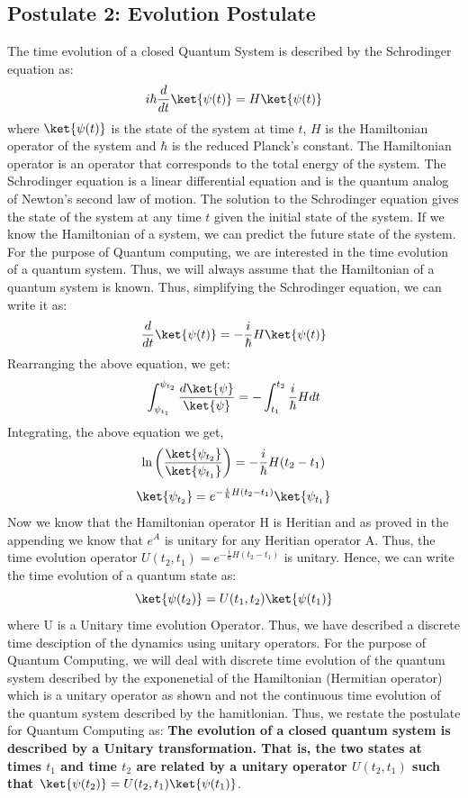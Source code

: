 \documentclass[12pt, oneside]{book}
\theoremstyle{definition}
\theoremstyle{definition}
\theoremstyle{remark}
\begin{document}
\subsection{Postulate 2: Evolution Postulate}\label{subsection:Postulate 2}
The time evolution of a closed Quantum System is described by the Schrodinger equation as:
\[
    i\hbar\frac{d}{dt}\ket{\psi(t)}=H\ket{\psi(t)}
\]
where $\ket{\psi(t)}$ is the state of the system at time $t$, $H$ is the Hamiltonian operator of the system and $\hbar$ is the reduced Planck's constant.
The Hamiltonian operator is an operator that corresponds to the total energy of the system. The Schrodinger equation is a linear differential equation and is the quantum analog of Newton's second law of motion.
The solution to the Schrodinger equation gives the state of the system at any time $t$ given the initial state of the system.
If we know the Hamiltonian of a system, we can predict the future state of the system. For the purpose of Quantum computing, we are interested in the time evolution of a quantum system. Thus, we will
always assume that the Hamiltonian of a quantum system is known. Thus, simplifying the Schrodinger equation, we can write it as:
\[
    \frac{d}{dt}\ket{\psi(t)}=-\frac{i}{\hbar}H\ket{\psi(t)}
\]
Rearranging the above equation, we get:
\[
    \int_{\psi_{t_1}}^{\psi_{t_2}} \frac{d\ket{\psi}}{\ket{\psi}}=-\int_{t_1}^{t_2}\frac{i}{\hbar}Hdt
\]
Integrating, the above equation we get,
\[
    \ln\left(\frac{\ket{\psi_{t_2}}}{\ket{\psi_{t_1}}}\right)=-\frac{i}{\hbar}H(t_2-t_1)
\]
\[\ket{\psi_{t_2}}=e^{-\frac{i}{\hbar}H(t_2-t_1)}\ket{\psi_{t_1}}\]
Now we know that the Hamiltonian operator H is Heritian and as proved in the appending we know that $e^{A}$ is unitary for any Heritian operator A.
Thus, the time evolution operator $U(t_2,t_1)=e^{-\frac{i}{\hbar}H(t_2-t_1)}$ is unitary.
Hence, we can write the time evolution of a quantum state as:
\[
    \ket{\psi(t_2)}=U(t_1,t_2)\ket{\psi(t_1)}
\]
where U is a Unitary time evolution Operator. Thus, we have described a discrete time desciption of the dynamics using unitary operators.
For the purpose of Quantum Computing, we will deal with discrete time evolution of the quantum system described by the exponenetial of the Hamiltonian (Hermitian operator) 
which is a unitary operator as shown and not the continuous time evolution of the quantum system described by the hamitlonian. Thus, we restate the postulate for Quantum Computing as:
\textbf{The evolution of a closed quantum system is described by a Unitary transformation. That is, the two states at times $t_1$ and time $t_2$ are related by
a unitary operator $U(t_2,t_1)$ such that $\ket{\psi(t_2)}=U(t_2,t_1)\ket{\psi(t_1)}$}.
\end{document}

